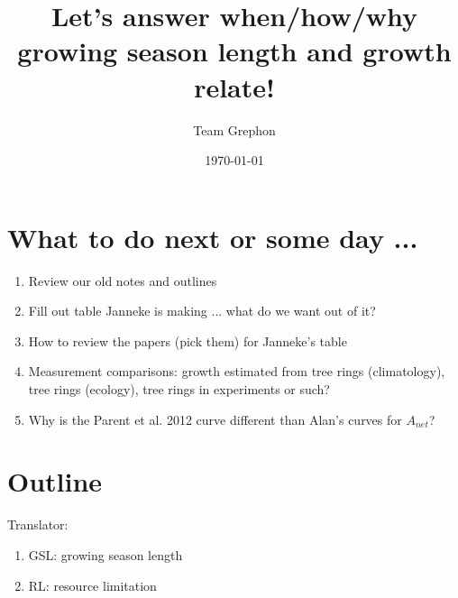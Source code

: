\documentclass[11pt,letter]{article}
\begin{document}

\renewcommand{\refname}{\CHead{}}

\title{Let's answer when/how/why growing season length and growth relate!}
\author{Team Grephon}
\date{\today}
\maketitle

\section{What to do next or some day ...}

\begin{enumerate}
\item Review our old notes and outlines
\item Fill out table Janneke is making ... what do we want out of it?
\item How to review the papers (pick them) for Janneke's table
\item Measurement comparisons: growth estimated from tree rings (climatology), tree rings (ecology), tree rings in experiments or such?
\item Why is the Parent et al. 2012 curve different than Alan's curves for $A_{net}$?
\end{enumerate}


\section{Outline}

Translator:
\begin{enumerate}
\item GSL: growing season length
\item RL: resource limitation
\end{enumerate}
\end{document}
